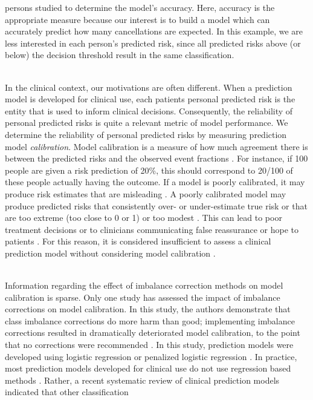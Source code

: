 \documentclass[AMA,STIX1COL,]{WileyNJD-v2}
\begin{document}
persons studied to determine the model's accuracy. Here, accuracy is the
appropriate measure because our interest is to build a model which can
accurately predict how many cancellations are expected. In this example,
we are less interested in each person's predicted risk, since all
predicted risks above (or below) the decision threshold result in the
same classification.\\
\strut \\
In the clinical context, our motivations are often different. When a
prediction model is developed for clinical use, each patients personal
predicted risk is the entity that is used to inform clinical decisions.
Consequently, the reliability of personal predicted risks is quite a
relevant metric of model performance. We determine the reliability of
personal predicted risks by measuring prediction model
\emph{calibration}. Model calibration is a measure of how much agreement
there is between the predicted risks and the observed event fractions
\citep{achilles}. For instance, if 100 people are given a risk
prediction of 20\%, this should correspond to 20/100 of these people
actually having the outcome. If a model is poorly calibrated, it may
produce risk estimates that are misleading \citep{achilles}. A poorly
calibrated model may produce predicted risks that consistently over- or
under-estimate true risk or that are too extreme (too close to 0 or 1)
or too modest \citep{achilles}. This can lead to poor treatment
decisions or to clinicians communicating false reassurance or hope to
patients \citep{achilles, 12days}. For this reason, it is considered
insufficient to assess a clinical prediction model without considering
model calibration \citep{epi}.\\
\strut \\
Information regarding the effect of imbalance correction methods on
model calibration is sparse. Only one study has assessed the impact of
imbalance corrections on model calibration. In this study, the authors
demonstrate that class imbalance corrections do more harm than good;
implementing imbalance corrections resulted in dramatically deteriorated
model calibration, to the point that no corrections were recommended
\citep{ruben}. In this study, prediction models were developed using
logistic regression or penalized logistic regression \citep{ruben}. In
practice, most prediction models developed for clinical use do not use
regression based methods \citep{constanza}. Rather, a recent systematic
review of clinical prediction models indicated that other classification
\end{document}
